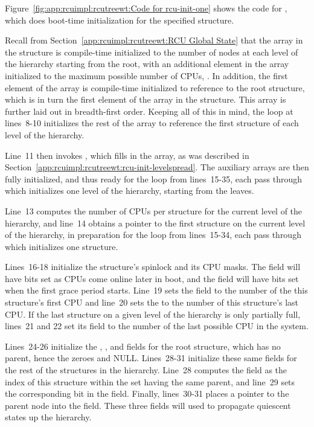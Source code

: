 Figure~\ref{fig:app:rcuimpl:rcutreewt:Code for rcu-init-one}
shows the code for , which does boot-time initialization
for the specified
 structure.

Recall from
Section~\ref{app:rcuimpl:rcutreewt:RCU Global State}
that the  array in the  structure
is compile-time initialized to the number of nodes at each level of
the hierarchy starting from the root,
with an additional element in the array initialized
to the maximum possible number of CPUs, .
In addition, the first element of the  array is compile-time
initialized to reference to the root  structure, which is
in turn
the first element of the  array in the  structure.
This array is further laid out in breadth-first order.
Keeping all of this in mind, the loop at lines~8-10 initializes the rest
of the  array to reference the first  structure
of each level of the  hierarchy.

Line~11 then invokes , which fills in the
 array, as was described in
Section~\ref{app:rcuimpl:rcutreewt:rcu-init-levelspread}.
The auxiliary arrays are then fully initialized, and thus ready for
the loop from lines~15-35, each pass through which initializes
one level of the  hierarchy, starting from the leaves.

Line~13 computes the number of CPUs per  structure for
the current level of the hierarchy, and line~14 obtains a pointer
to the first  structure on the current level of the
hierarchy, in preparation for the loop from lines~15-34, each pass
through which initializes one  structure.

Lines~16-18 initialize the  structure's spinlock and
its CPU masks.
The  field will have bits set as CPUs come online
later in boot, and the  field will have bits set
when the first grace period starts.
Line~19 sets the  field to the number of the this
 structure's first CPU and line~20 sets the
 to the number of this  structure's
last CPU.
If the last  structure on a given level of the
hierarchy is only partially full, lines~21 and 22 set its
 field to the number of the last possible CPU in the system.

Lines~24-26 initialize the , , and
 fields for the root  structure, which
has no parent, hence the zeroes and NULL.
Lines~28-31 initialize these same fields for the rest of the
 structures in the hierarchy.
Line~28 computes the  field as the index of this
 structure within
the set having the same parent, and
line~29 sets the corresponding bit in the  field.
Finally, lines~30-31 places a pointer to the parent node into the
 field.
These three fields will used to propagate quiescent states up the
hierarchy.

